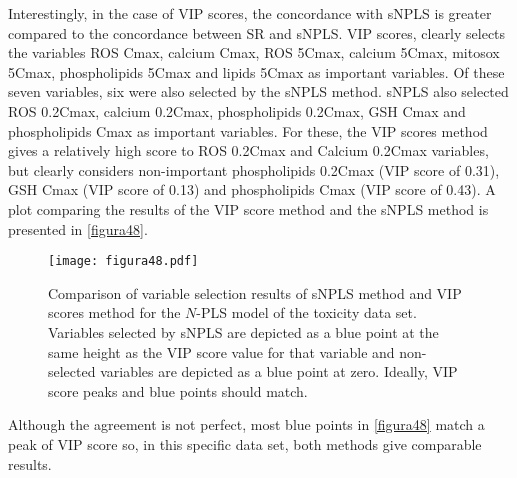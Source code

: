 Interestingly, in the case of VIP scores, the concordance with sNPLS is greater compared to the concordance between SR and sNPLS. VIP scores, clearly selects the variables ROS Cmax, calcium Cmax, ROS 5Cmax, calcium 5Cmax, mitosox 5Cmax, phospholipids 5Cmax and lipids 5Cmax as important variables. Of these seven variables, six were also selected by the sNPLS method. sNPLS also selected ROS 0.2Cmax, calcium 0.2Cmax, phospholipids 0.2Cmax, GSH Cmax and phospholipids Cmax as important variables. For these, the VIP scores method gives a relatively high score to ROS 0.2Cmax and Calcium 0.2Cmax variables, but clearly considers non-important phospholipids 0.2Cmax (VIP score of 0.31), GSH Cmax (VIP score of 0.13) and phospholipids Cmax (VIP score of 0.43). A plot comparing the results of the VIP score method and the sNPLS method is presented in \autoref{figura48}.

\vspace{10pt}

\begin{figure}[hbtp]
	\centering
\texttt{[image: figura48.pdf]}
\caption[Comparison of variable selection results of sNPLS method and VIP scores method]{Comparison of variable selection results of sNPLS method and VIP scores method for the $N$-PLS model of the toxicity data set. Variables selected by sNPLS are depicted as a blue point at the same height as the VIP score value for that variable and non-selected variables are depicted as a blue point at zero. Ideally, VIP score peaks and blue points should match.}
\label{figura48}
\end{figure}

Although the agreement is not perfect, most blue points in \autoref{figura48} match a peak of VIP score so, in this specific data set, both methods give comparable results.